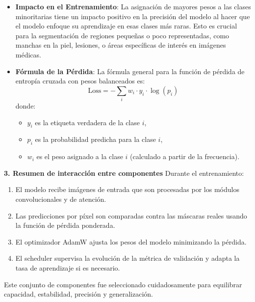 \begin{itemize}
\begin{itemize}
        \item \textbf{Impacto en el Entrenamiento}: 
        La asignación de mayores pesos a las clases minoritarias tiene un impacto positivo en la precisión del modelo al hacer que el modelo enfoque su aprendizaje en esas clases más raras. Esto es crucial para la segmentación de regiones pequeñas o poco representadas, como manchas en la piel, lesiones, o áreas específicas de interés en imágenes médicas.

        \item \textbf{Fórmula de la Pérdida}: 
        La fórmula general para la función de pérdida de entropía cruzada con pesos balanceados es:
        \[
        \text{Loss} = - \sum_{i} w_i \cdot y_i \cdot \log(p_i)
        \]
        donde:
        \begin{itemize}
            \item \( y_i \) es la etiqueta verdadera de la clase \( i \),
            \item \( p_i \) es la probabilidad predicha para la clase \( i \),
            \item \( w_i \) es el peso asignado a la clase \( i \) (calculado a partir de la frecuencia).
        \end{itemize}
    \end{itemize}
\end{itemize}

\textbf{3. Resumen de interacción entre componentes}
Durante el entrenamiento:
\begin{enumerate}
\item El modelo recibe imágenes de entrada que son procesadas por los módulos convolucionales y de atención.
\item Las predicciones por píxel son comparadas contra las máscaras reales usando la función de pérdida ponderada.
\item El optimizador AdamW ajusta los pesos del modelo minimizando la pérdida.
\item El scheduler supervisa la evolución de la métrica de validación y adapta la tasa de aprendizaje si es necesario.
\end{enumerate}

Este conjunto de componentes fue seleccionado cuidadosamente para equilibrar capacidad, estabilidad, precisión y generalización.


